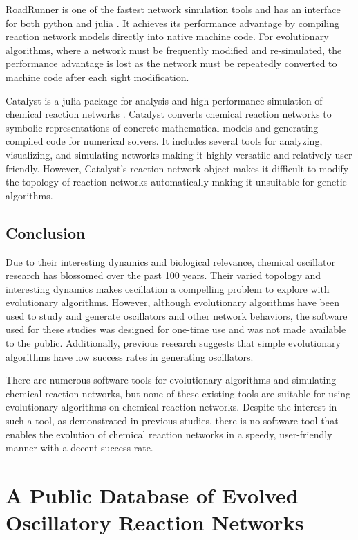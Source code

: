 \documentclass[12pt]{report}
\begin{document}
RoadRunner is one of the fastest network simulation tools and has an interface for both python and julia \cite{Welsh2022}. It achieves its performance advantage by compiling reaction network models directly into native machine code. For evolutionary algorithms, where a network must be frequently modified and re-simulated, the performance advantage is lost as the network must be repeatedly converted to machine code after each sight modification.

Catalyst is a julia package for analysis and high performance simulation of chemical reaction networks \cite{Loman2023}. Catalyst converts chemical reaction networks to symbolic representations of concrete mathematical models and generating compiled code for numerical solvers. It includes several tools for analyzing, visualizing, and simulating networks making it highly versatile and relatively user friendly. However, Catalyst's reaction network object makes it difficult to modify the topology of reaction networks automatically making it unsuitable for genetic algorithms. 

\section{Conclusion}
Due to their interesting dynamics and biological relevance, chemical oscillator research has blossomed over the past 100 years. Their varied topology and interesting dynamics makes oscillation a compelling problem to explore with evolutionary algorithms. However, although evolutionary algorithms have been used to study and generate oscillators and other network behaviors, the software used for these studies was designed for one-time use and was not made available to the public. Additionally, previous research suggests that simple evolutionary algorithms have low success rates in generating oscillators.

There are numerous software tools for evolutionary algorithms and simulating chemical reaction networks, but none of these existing tools are suitable for using evolutionary algorithms on chemical reaction networks. Despite the interest in such a tool, as demonstrated in previous studies, there is no software tool that enables the evolution of chemical reaction networks in a speedy, user-friendly manner with a decent success rate.

\chapter{A Public Database of Evolved Oscillatory Reaction Networks}
\label{chap: cesium_paper}
\end{document}
